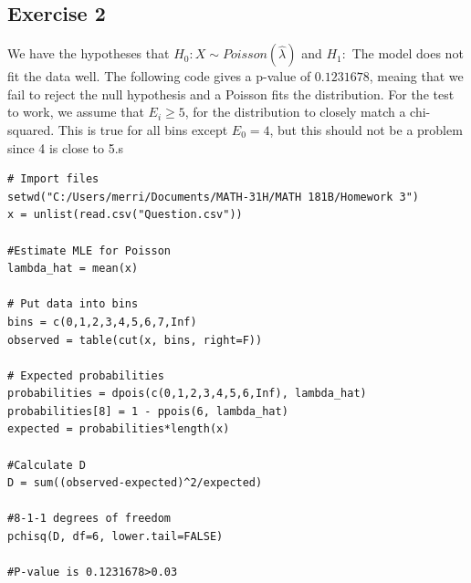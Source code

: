 \documentclass{article}
\begin{document}
\subsection*{Exercise 2}
We have the hypotheses that $H_0: X \sim Poisson(\hat{\lambda})$
and $H_1: $ The model does not fit the data well.
The following code gives a p-value of $0.1231678$,
meaing that we fail to reject the null hypothesis and 
a Poisson fits the distribution.
For the test to work, we assume that $E_i \geq 5$, 
for the distribution to closely match a chi-squared.
This is true for all bins except $E_0 = 4$,
but this should not be a problem since 4 is close to 5.s
\begin{lstlisting}
# Import files
setwd("C:/Users/merri/Documents/MATH-31H/MATH 181B/Homework 3")
x = unlist(read.csv("Question.csv"))

#Estimate MLE for Poisson
lambda_hat = mean(x)

# Put data into bins
bins = c(0,1,2,3,4,5,6,7,Inf)
observed = table(cut(x, bins, right=F))

# Expected probabilities
probabilities = dpois(c(0,1,2,3,4,5,6,Inf), lambda_hat)
probabilities[8] = 1 - ppois(6, lambda_hat)
expected = probabilities*length(x)

#Calculate D
D = sum((observed-expected)^2/expected)

#8-1-1 degrees of freedom
pchisq(D, df=6, lower.tail=FALSE)

#P-value is 0.1231678>0.03
\end{lstlisting}
\newpage 
\end{document}
